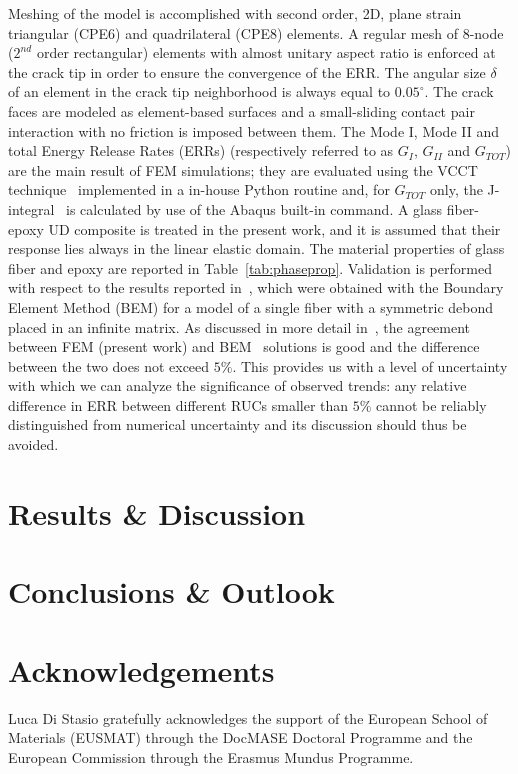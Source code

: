\documentclass[review]{elsarticle}
\begin{document}
Meshing of the model is accomplished with second order, 2D, plane strain triangular (CPE6) and quadrilateral (CPE8) elements. A regular mesh of 8-node ($2^{nd}$ order rectangular) elements with almost unitary aspect ratio is enforced at the crack tip in order to ensure the convergence of the ERR. The angular size $\delta$ of an element in the crack tip neighborhood is always equal to $0.05^{\circ}$. The crack faces are modeled as element-based surfaces and a small-sliding contact pair interaction with no friction is imposed between them. The Mode I, Mode II and total Energy Release Rates (ERRs) (respectively referred to as $G_{I}$, $G_{II}$ and $G_{TOT}$) are the main result of FEM simulations; they are evaluated using the VCCT technique~\cite{Krueger2004} implemented in a in-house Python routine and, for $G_{TOT}$ only, the J-integral~\cite{Rice1968} is calculated by use of the Abaqus built-in command. A glass fiber-epoxy UD composite is treated in the present work, and it is assumed that their response lies always in the linear elastic domain. The material properties of glass fiber and epoxy are reported in Table~\ref{tab:phaseprop}. Validation is performed with respect to the results reported in~\cite{Paris2007,Sandino2016}, which were obtained with the Boundary Element Method (BEM) for a model of a single fiber with a symmetric debond placed in an infinite matrix. As discussed in more detail in~\cite{DiStasio2019}, the agreement between FEM (present work) and BEM~\cite{Paris2007,Sandino2016} solutions is good and the difference between the two does not exceed $5\%$. This provides us with a level of uncertainty with which we can analyze the significance of observed trends: any relative difference in ERR between different RUCs smaller than $5\%$ cannot be reliably distinguished from numerical uncertainty and its discussion should thus be avoided.

\section{Results \& Discussion}



\section{Conclusions \& Outlook}

\section*{Acknowledgements}

Luca Di Stasio gratefully acknowledges the support of the European School of Materials (EUSMAT) through the DocMASE Doctoral Programme and the European Commission through the Erasmus Mundus Programme.


\end{document}
